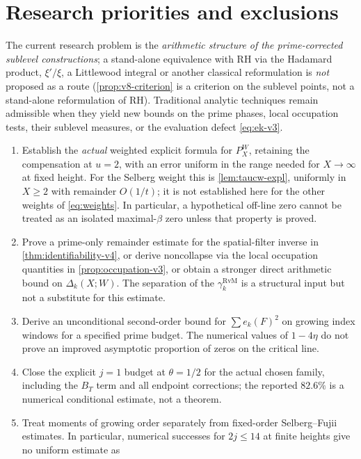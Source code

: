 \documentclass[11pt,a4paper]{article}
\numberwithin{equation}{section}
\theoremstyle{definition}
\theoremstyle{remark}
\begin{document}
\section{Research priorities and exclusions}\label{sec:scope-v3}
The current research problem is the \emph{arithmetic structure of the
prime-corrected sublevel constructions}; a stand-alone equivalence with
RH via the Hadamard product, $\xi'/\xi$, a Littlewood integral or
another classical reformulation is \emph{not} proposed as a route (\cref{prop:v8-criterion} is a criterion on the sublevel points, not a stand-alone reformulation of RH).
Traditional analytic techniques remain admissible when they yield new
bounds on the prime phases, local occupation tests, their sublevel
measures, or the evaluation defect \eqref{eq:ek-v3}.

\begin{enumerate}[leftmargin=*,itemsep=4pt]
\item Establish the \emph{actual} weighted explicit formula for
$P_X^W$, retaining the compensation at $u=2$, with an error uniform
in the range needed for $X\to\infty$ at fixed height. For the Selberg weight this is \cref{lem:taucw-expl}, uniformly in $X\ge2$ with remainder $O(1/t)$; it is not established here for the other weights of \eqref{eq:weights}. In particular,
a hypothetical off-line zero cannot be treated as an isolated
maximal-$\beta$ zero unless that property is proved.
\item Prove a prime-only remainder estimate for the spatial-filter inverse in \cref{thm:identifiability-v4}, or derive noncollapse via the local occupation quantities in
\cref{prop:occupation-v3}, or obtain a stronger direct arithmetic
bound on $\Delta_k(X;W)$. The separation of the
$\gamma_k^{\mathrm{RvM}}$ is a structural input but not a substitute
for this estimate.
\item Derive an unconditional second-order bound for
$\sum e_k(F)^2$ on growing index windows for a specified prime
budget. The numerical values of $1-4\eta$ do not prove an improved
asymptotic proportion of zeros on the critical line.
\item Close the explicit $j=1$ budget at $\theta=1/2$ for the actual chosen family, including the $B_T$ term and all endpoint corrections; the reported $82.6\%$ is a numerical conditional estimate, not a theorem.
\item Treat moments of growing order separately from fixed-order
Selberg--Fujii estimates. In particular, numerical successes for
$2j\le14$ at finite heights give no uniform estimate as

\end{enumerate}
\end{document}
